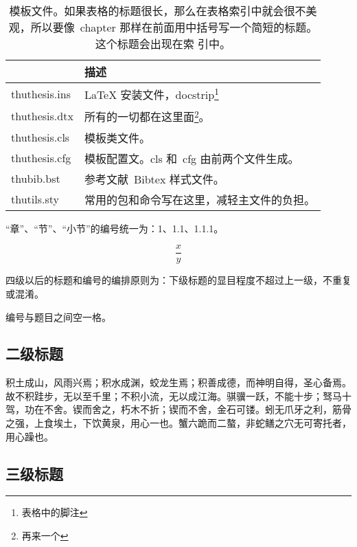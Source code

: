     \begin{table}[htb]
  \centering
  \begin{minipage}[t]{0.8\linewidth} 
  \caption[模板文件]{模板文件。如果表格的标题很长，那么在表格索引中就会很不美
    观，所以要像~chapter 那样在前面用中括号写一个简短的标题。这个标题会出现在索
    引中。}
  \label{tab:template-files}
    \begin{tabular*}{\linewidth}{lp{10cm}}
      \toprule[1.5pt]
      {} & {\bf 描述} \\\midrule[1pt]
      thuthesis.ins & \LaTeX{} 安装文件，docstrip\footnote{表格中的脚注} \\
      thuthesis.dtx & 所有的一切都在这里面\footnote{再来一个}。\\
      thuthesis.cls & 模板类文件。\\
      thuthesis.cfg & 模板配置文。cls 和~cfg 由前两个文件生成。\\
      thubib.bst    & 参考文献~Bibtex 样式文件。\\
      thutils.sty   & 常用的包和命令写在这里，减轻主文件的负担。\\
      \bottomrule[1.5pt]
    \end{tabular*}
  \end{minipage}
\end{table}

    “章”、“节”、“小节”的编号统一为：1、1.1、1.1.1。
    
\begin{equation}
\frac{x}{y}
\end{equation}


    四级以后的标题和编号的编排原则为：下级标题的显目程度不超过上一级，不重复或混淆。

    编号与题目之间空一格。

    \subsection{二级标题}
    

        积土成山，风雨兴焉；积水成渊，蛟龙生焉；积善成德，而神明自得，圣心备焉。故不积跬步，无以至千里；不积小流，无以成江海。骐骥一跃，不能十步；驽马十驾，功在不舍。锲而舍之，朽木不折；锲而不舍，金石可镂。蚓无爪牙之利，筋骨之强，上食埃土，下饮黄泉，用心一也。蟹六跪而二螯，非蛇鳝之穴无可寄托者，用心躁也。
         

        \subsection{三级标题}

